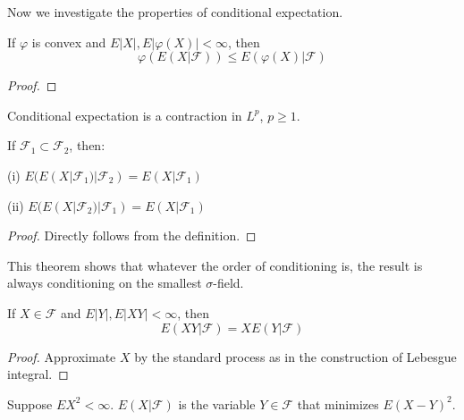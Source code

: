 Now we investigate the properties of conditional expectation.
\begin{theorem}

\end{theorem}
\begin{theorem}
If $\varphi$ is convex and $E\left|X\right|,E\left|\varphi(X)\right|<\infty$, then \[\varphi(E(X|\mathcal{F}))\le E(\varphi(X)|\mathcal{F})\]
\end{theorem}
\begin{proof}

\end{proof}
\begin{corollary}
Conditional expectation is a contraction in $L^p$, $p\geq 1$.
\end{corollary}
\begin{theorem}
If $\mathcal{F}_1\subset\mathcal{F}_2$, then:\par
(i) $E(E(X|\mathcal{F}_1)|\mathcal{F}_2)=E(X|\mathcal{F}_1)$\par
(ii) $E(E(X|\mathcal{F}_2)|\mathcal{F}_1)=E(X|\mathcal{F}_1)$
\end{theorem}
\begin{proof}
Directly follows from the definition.
\end{proof}
\begin{remark}
This theorem shows that whatever the order of conditioning is, the result is always conditioning on the smallest $\sigma$-field.
\end{remark}
\begin{theorem}
If $X\in\mathcal{F}$ and $E\left|Y\right|,E\left|XY\right|<\infty$, then \[E(XY|\mathcal{F})=XE(Y|\mathcal{F})\]
\end{theorem}
\begin{proof}
Approximate $X$ by the standard process as in the construction of Lebesgue integral.
\end{proof}
\begin{theorem}[LSE]
Suppose $EX^2<\infty$. $E(X|\mathcal{F})$ is the variable $Y\in\mathcal{F}$ that minimizes $E(X-Y)^2$.
\end{theorem}

